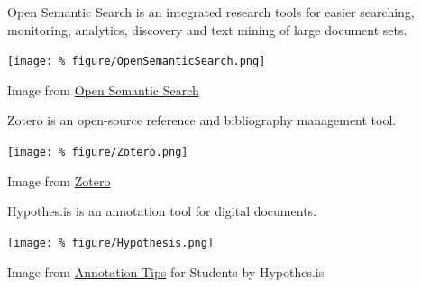 \documentclass[unknownkeysallowed,usepdftitle=false, parskip=full, aspectratio=169]{beamer}
\newcommand{\secvariable}{nothing}
\newcommand{\mysection}[1]{\renewcommand{\secvariable}{#1}
}
\begin{document}
\mysection{major}
\begin{frame}\label{\secvariable} %

Open Semantic Search is an integrated research tools for easier searching, monitoring, analytics, discovery and text mining of large document sets.
  \vspace{0.5cm}

\texttt{[image: \%
figure/OpenSemanticSearch.png]}  

\tiny Image from \href{https://www.opensemanticsearch.org/doc/search}{Open Semantic Search}

\end{frame}

\mysection{slab}
\begin{frame}\label{\secvariable}

Zotero is an open-source reference and bibliography management tool.
  \vspace{0.5cm}

\texttt{[image: \%
figure/Zotero.png]}

\tiny Image from \href{https://www.zotero.org/}{Zotero}


\end{frame}





\mysection{minor}
\begin{frame}\label{\secvariable} %

Hypothes.is is an annotation tool for digital documents.
  \vspace{0.5cm}

\texttt{[image: \%
figure/Hypothesis.png]}

\tiny Image from \href{https://web.hypothes.is/annotation-tips-for-students/}{Annotation Tips} for Students by Hypothes.is 

\end{frame}
\end{document}
